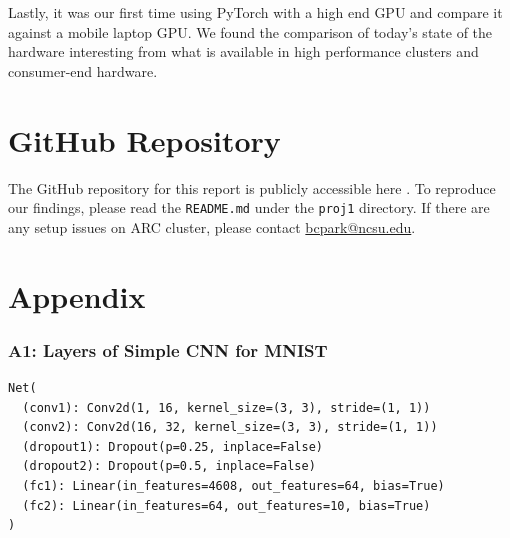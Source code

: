 \documentclass{article}
\begin{document}
Lastly, it was our first time using PyTorch with a high end GPU and compare it against a mobile laptop GPU. We found the comparison of today's state of the hardware interesting from what is available in high performance clusters and consumer-end hardware.

\section{GitHub Repository}
The GitHub repository for this report is publicly accessible here \cite{repo}. To reproduce our findings, please read the \verb|README.md| under the \verb|proj1| directory. If there are any setup issues on ARC cluster, please contact \href{mailto:bcpark@ncsu.edu}{bcpark@ncsu.edu}.




\section{Appendix}


\subsubsection{A1: Layers of Simple CNN for MNIST}
\label{sec:A1}
\begin{verbatim}
Net(
  (conv1): Conv2d(1, 16, kernel_size=(3, 3), stride=(1, 1))
  (conv2): Conv2d(16, 32, kernel_size=(3, 3), stride=(1, 1))
  (dropout1): Dropout(p=0.25, inplace=False)
  (dropout2): Dropout(p=0.5, inplace=False)
  (fc1): Linear(in_features=4608, out_features=64, bias=True)
  (fc2): Linear(in_features=64, out_features=10, bias=True)
)
\end{verbatim}
\end{document}
